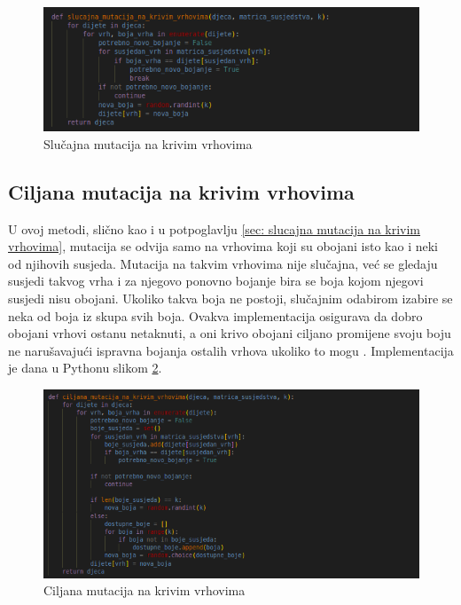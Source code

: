 \documentclass[times, utf8, zavrsni, numeric]{fer}
\begin{document}
\begin{figure}[htb]
\centering
\includegraphics[width=14cm]{images/slucajna_mutacija_na_krivim_vrhovima.png}
\caption{Slučajna mutacija na krivim vrhovima}
\label{fig:slucajna mutacija na krivim vrhovima}
\end{figure}

\subsection{Ciljana mutacija na krivim vrhovima}
\label{sec: ciljana mutacija na krivim vrhovima}
U ovoj metodi, slično kao i u potpoglavlju \ref{sec: slucajna mutacija na krivim vrhovima}, mutacija se odvija samo na vrhovima koji su obojani isto kao i neki od njihovih susjeda. Mutacija na takvim vrhovima nije slučajna, već se gledaju susjedi takvog vrha i za njegovo ponovno bojanje bira se boja kojom njegovi susjedi nisu obojani. Ukoliko takva boja ne postoji, slučajnim odabirom izabire se neka od boja iz skupa svih boja. Ovakva implementacija osigurava da dobro obojani vrhovi ostanu netaknuti, a oni krivo obojani ciljano promijene svoju boju ne narušavajući ispravna bojanja ostalih vrhova ukoliko to mogu \cite{hindi2012genetic}. Implementacija je dana u Pythonu slikom \ref{fig:ciljana mutacija na krivim vrhovima}.

\begin{figure}[htb]
\centering
\includegraphics[width=14cm]{images/ciljana_mutacija_na_krivim_vrhovima.png}
\caption{Ciljana mutacija na krivim vrhovima}
\label{fig:ciljana mutacija na krivim vrhovima}
\end{figure}
\end{document}
